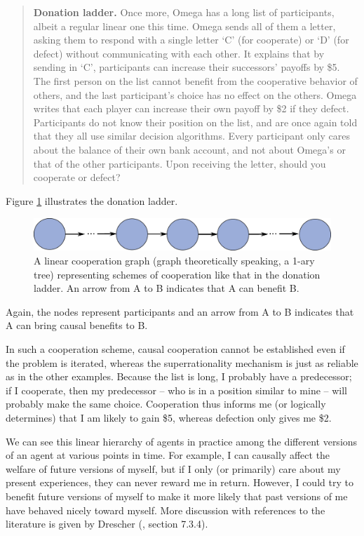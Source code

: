 \begin{quote}
\textbf{Donation ladder.} Once more, Omega has a long list of
participants, albeit a regular linear one this time. Omega sends all of
them a letter, asking them to respond with a single letter `C' (for
cooperate) or `D' (for defect) without communicating with each other. It
explains that by sending in `C', participants can increase their
successors' payoffs by \$5. The first person on the list cannot benefit
from the cooperative behavior of others, and the last participant's
choice has no effect on the others. Omega writes that each player can
increase their own payoff by \$2 if they defect. Participants do not
know their position on the list, and are once again told that they all
use similar decision algorithms. Every participant only cares about the
balance of their own bank account, and not about Omega's or that of the
other participants. Upon receiving the letter, should you cooperate or
defect?
\end{quote}

Figure \ref{donation-ladder} illustrates the donation
ladder.

\begin{figure}[h!]
    \centering
    \includegraphics[width=5.19271in,height=0.49167in]{figs/donation-ladder}
    \caption{A linear cooperation graph (graph theoretically
speaking, a 1-ary tree) representing schemes of cooperation like that in
the donation ladder. An arrow from A to B indicates that A can benefit
B.}
    \label{donation-ladder}
\end{figure}

Again, the nodes represent participants and an arrow from A to B
indicates that A can bring causal benefits to B.

In such a cooperation scheme, causal cooperation cannot be established
even if the problem is iterated, whereas the superrationality mechanism
is just as reliable as in the other examples. Because the list is long,
I probably have a predecessor; if I cooperate, then my predecessor --
who is in a position similar to mine -- will probably make the same
choice. Cooperation thus informs me (or logically determines) that I am
likely to gain \$5, whereas defection only gives me \$2.

We can see this linear hierarchy of agents in practice among the
different versions of an agent at various points in time. For example, I
can causally affect the welfare of future versions of myself, but if I
only (or primarily) care about my present experiences, they can never
reward me in return. However, I could try to benefit future versions of
myself to make it more likely that past versions of me have behaved
nicely toward myself. More discussion with references to the literature
is given by Drescher (\cite{Drescher2006-ky}, section 7.3.4).

